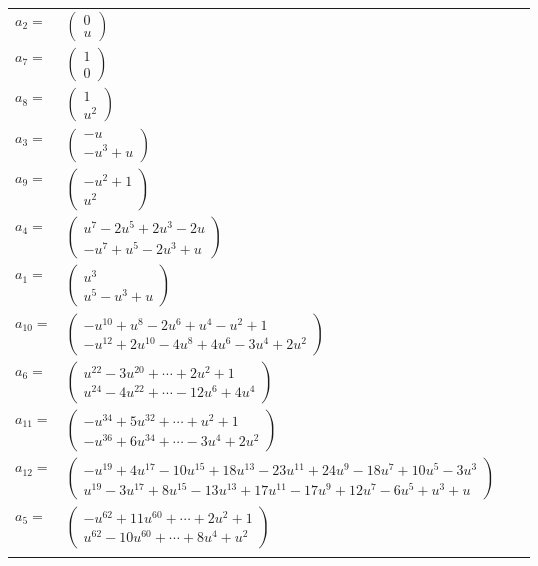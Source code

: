 \documentclass[1p]{elsarticle_modified}
\theoremstyle{definition}
\begin{document}
\begin{tabular}{m{7pt} m{180pt} m{7pt} m{180pt} }
\flushright $a_{2}=$&$\begin{pmatrix}0\\u\end{pmatrix}$ \\
\flushright $a_{7}=$&$\begin{pmatrix}1\\0\end{pmatrix}$ \\
\flushright $a_{8}=$&$\begin{pmatrix}1\\u^2\end{pmatrix}$ \\
\flushright $a_{3}=$&$\begin{pmatrix}- u\\- u^3+u\end{pmatrix}$ \\
\flushright $a_{9}=$&$\begin{pmatrix}- u^2+1\\u^2\end{pmatrix}$ \\
\flushright $a_{4}=$&$\begin{pmatrix}u^7-2 u^5+2 u^3-2 u\\- u^7+u^5-2 u^3+u\end{pmatrix}$ \\
\flushright $a_{1}=$&$\begin{pmatrix}u^3\\u^5- u^3+u\end{pmatrix}$ \\
\flushright $a_{10}=$&$\begin{pmatrix}- u^{10}+u^8-2 u^6+u^4- u^2+1\\- u^{12}+2 u^{10}-4 u^8+4 u^6-3 u^4+2 u^2\end{pmatrix}$ \\
\flushright $a_{6}=$&$\begin{pmatrix}u^{22}-3 u^{20}+\cdots+2 u^2+1\\u^{24}-4 u^{22}+\cdots-12 u^6+4 u^4\end{pmatrix}$ \\
\flushright $a_{11}=$&$\begin{pmatrix}- u^{34}+5 u^{32}+\cdots+u^2+1\\- u^{36}+6 u^{34}+\cdots-3 u^4+2 u^2\end{pmatrix}$ \\
\flushright $a_{12}=$&$\begin{pmatrix}- u^{19}+4 u^{17}-10 u^{15}+18 u^{13}-23 u^{11}+24 u^9-18 u^7+10 u^5-3 u^3\\u^{19}-3 u^{17}+8 u^{15}-13 u^{13}+17 u^{11}-17 u^9+12 u^7-6 u^5+u^3+u\end{pmatrix}$ \\
\flushright $a_{5}=$&$\begin{pmatrix}- u^{62}+11 u^{60}+\cdots+2 u^2+1\\u^{62}-10 u^{60}+\cdots+8 u^4+u^2\end{pmatrix}$\\&\end{tabular}
\end{document}
